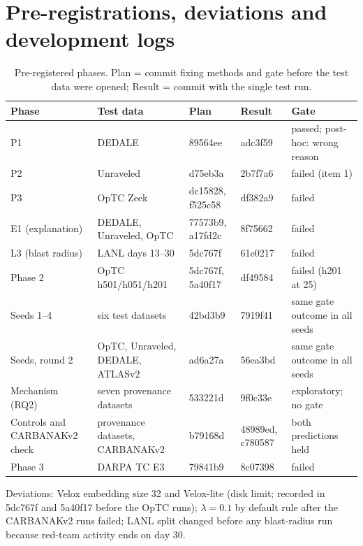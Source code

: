 \documentclass[acmlarge,screen,review]{acmart}
\begin{document}
\section{Pre-registrations, deviations and development logs}\label{app:prereg}
\begin{table}[!htbp]
\centering\footnotesize
\caption{Pre-registered phases. Plan = commit fixing methods and gate before the test data were opened; Result =
commit with the single test run.}
\label{tab:prereg}
\begin{tabularx}{\textwidth}{@{}YYllY@{}}
\toprule
Phase & Test data & Plan & Result & Gate \\
\midrule
P1 & DEDALE & 89564ee & adc3f59 & passed; post-hoc: wrong reason \\
P2 & Unraveled & d75eb3a & 2b7f7a6 & failed (item 1) \\
P3 & OpTC Zeek & dc15828, f525c58 & df382a9 & failed \\
E1 (explanation) & DEDALE, Unraveled, OpTC & 77573b9, a17fd2c & 8f75662 & failed \\
L3 (blast radius) & LANL days 13--30 & 5dc767f & 61e0217 & failed \\
Phase 2 & OpTC h501/h051/h201 & 5dc767f, 5a40f17 & df49584 & failed (h201 at 25) \\
Seeds 1--4 & six test datasets & 42bd3b9 & 7919f41 & same gate outcome in all seeds \\
Seeds, round 2 & OpTC, Unraveled, DEDALE, ATLASv2 & ad6a27a & 56ea3bd & same gate outcome in all seeds \\
Mechanism (RQ2) & seven provenance datasets & 533221d & 9f0c33e & exploratory; no gate \\
Controls and CARBANAKv2 check & provenance datasets, CARBANAKv2 & b79168d & 48989ed, c780587 & both predictions held \\
Phase 3 & DARPA TC E3 & 79841b9 & 8c07398 & failed \\
\bottomrule
\end{tabularx}
\end{table}
Deviations: Velox embedding size 32 and Velox-lite (disk limit; recorded in 5dc767f and 5a40f17 before the OpTC
runs); $\lambda=0.1$ by default rule after the CARBANAKv2 runs failed; LANL split changed before any blast-radius
run because red-team activity ends on day 30.
\end{document}
